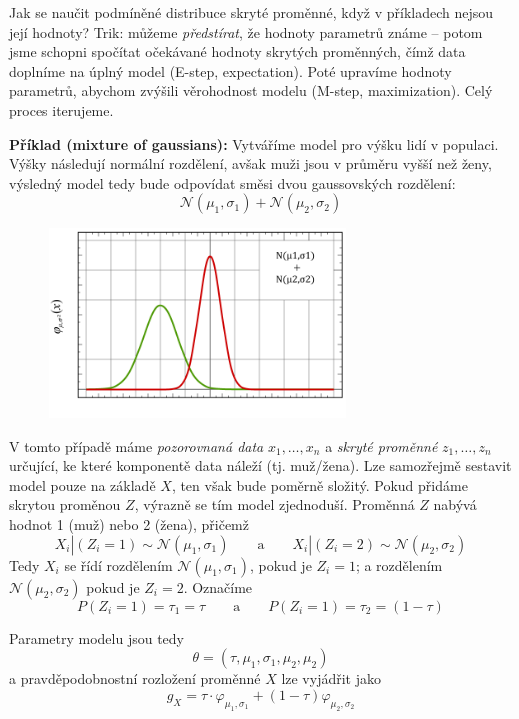 \documentclass[11pt]{report} %
\numberwithin{equation}{section}
\begin{document}
Jak se naučit podmíněné distribuce skryté proměnné, když v příkladech nejsou její hodnoty? Trik: můžeme \textit{předstírat}, že hodnoty parametrů známe -- potom jsme schopni spočítat očekávané hodnoty skrytých proměnných, čímž data doplníme na úplný model (E-step, expectation). Poté upravíme hodnoty parametrů, abychom
zvýšili věrohodnost modelu (M-step, maximization). Celý proces iterujeme.

\textbf{Příklad (mixture of gaussians):} Vytváříme model pro výšku lidí v populaci. Výšky následují normální rozdělení, avšak muži jsou v průměru vyšší než ženy, výsledný model tedy bude odpovídat směsi dvou gaussovských rozdělení:
$$\mathcal{N}(\mu_1, \sigma_1) + \mathcal{N}(\mu_2, \sigma_2)$$ 

\begin{figure}[H]
	\centering
	\includegraphics[width=0.7\textwidth]{img/mixture_gaussians.png}
\end{figure}

V tomto případě máme \textit{pozorovnaná data} $x_1, \dots, x_n$ a \textit{skryté proměnné} $z_1, \dots, z_n$ určující, ke které komponentě data náleží (tj. muž/žena). Lze samozřejmě sestavit model pouze na základě $X$, ten však bude poměrně složitý. Pokud přidáme skrytou proměnou $Z$, výrazně se tím model zjednoduší. Proměnná $Z$ nabývá hodnot 1 (muž) nebo 2 (žena), přičemž
$$X_i|(Z_i = 1) \sim \mathcal{N}(\mu_1,\sigma_1) \qquad\text{a}\qquad X_i|(Z_i = 2) \sim \mathcal{N}(\mu_2,\sigma_2)$$
Tedy $X_i$ se řídí rozdělením $\mathcal{N}(\mu_1,\sigma_1)$, pokud je $Z_i = 1$; a rozdělením $\mathcal{N}(\mu_2,\sigma_2)$ pokud je $Z_i = 2$. Označíme
$$P(Z_i = 1) = \tau_1 = \tau \qquad \text{a}\qquad P(Z_i = 1) = \tau_2 = (1-\tau)$$

Parametry modelu jsou tedy 
$$\theta = (\tau,\mu_1,\sigma_1,\mu_2,\mu_2)$$
a pravděpodobnostní rozložení proměnné $X$ lze vyjádřit jako
$$g_X = \tau\cdot \varphi_{\mu_1,\sigma_1} + (1 - \tau)\varphi_{\mu_2,\sigma_2}$$
\end{document}
